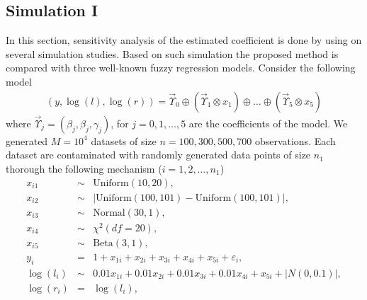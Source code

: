 \documentclass{IJFS}
\begin{document}
\subsection{Simulation I}
In this section,   sensitivity analysis of the estimated  coefficient is done by using on several simulation studies.
Based on such simulation the proposed method is compared with three well-known fuzzy regression models.
Consider the following model
\begin{eqnarray*}
(y,\log(l),\log(r)) = \vec{\Upsilon}_0 \oplus (\vec{\Upsilon}_1 \otimes x_1) \oplus\ldots \oplus (\vec{\Upsilon}_5\otimes x_5)
\end{eqnarray*}
where
$\vec{\Upsilon}_j  = (\beta_j,\beta_j,\gamma_j)$, for $j=0,1,\ldots,5$ are the coefficients of the model.
We generated $M=10^4$ datasets of size $n=100,300,500,700$ observations.
Each dataset are contaminated with randomly generated   data points of size $n_1$
thorough the following mechanism ($i=1,2,\ldots,n_1$)
\begin{eqnarray*}
x_{i1}    & \sim &   \textrm{Uniform}(10,20),                                     \\
x_{i2}    & \sim &   |\textrm{Uniform}(100,101)-\textrm{Uniform}(100,101)|,       \\
x_{i3}    & \sim &   \textrm{Normal}(30,1),                                       \\
x_{i4}    & \sim &   \chi^2(df=20),                                               \\
x_{i5}    & \sim &   \textrm{Beta}(3,1),                                          \\
y_i       &  =   &   1  + x_{1i} +      x_{2i}+      x_{3i} +      x_{4i} +  x_{5i} + \varepsilon_i,            \\
\log(l_i) & \sim &   0.01 x_{1i} + 0.01 x_{2i}+ 0.01 x_{3i} + 0.01 x_{4i} +  x_{5i} + |N(0,0.1)|,             \\
\log(r_i) & =    &   \log(l_i),
\end{eqnarray*}
\end{document}
